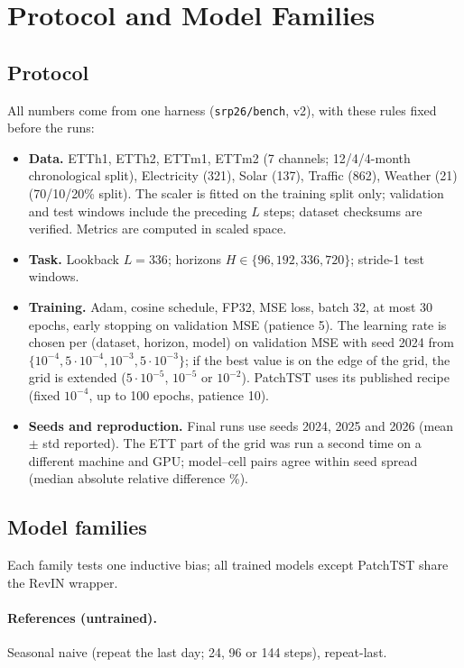 \documentclass[11pt,a4paper]{article}
\begin{document}
\section{Protocol and Model Families}
\label{sec:protocol}

\subsection{Protocol}
All numbers come from one harness (\texttt{srp26/bench}, v2), with these rules fixed before the runs:
\begin{itemize}
    \item \textbf{Data.} ETTh1, ETTh2, ETTm1, ETTm2 (7 channels; 12/4/4-month chronological split), Electricity (321), Solar (137), Traffic (862), Weather (21) (70/10/20\% split). The scaler is fitted on the training split only; validation and test windows include the preceding $L$ steps; dataset checksums are verified. Metrics are computed in scaled space.
    \item \textbf{Task.} Lookback $L{=}336$; horizons $H\in\{96,192,336,720\}$; stride-1 test windows.
    \item \textbf{Training.} Adam, cosine schedule, FP32, MSE loss, batch 32, at most 30 epochs, early stopping on validation MSE (patience 5). The learning rate is chosen per (dataset, horizon, model) on validation MSE with seed 2024 from $\{10^{-4},5\cdot10^{-4},10^{-3},5\cdot10^{-3}\}$; if the best value is on the edge of the grid, the grid is extended ($5\cdot10^{-5}$, $10^{-5}$ or $10^{-2}$). PatchTST uses its published recipe (fixed $10^{-4}$, up to 100 epochs, patience 10).
    \item \textbf{Seeds and reproduction.} Final runs use seeds 2024, 2025 and 2026 (mean $\pm$ std reported). The ETT part of the grid was run a second time on a different machine and GPU; \xmAgree{} model--cell pairs agree within seed spread (median absolute relative difference \xmMedAbs\%).
\end{itemize}

\subsection{Model families}
Each family tests one inductive bias; all trained models except PatchTST share the RevIN wrapper.

\paragraph{References (untrained).} Seasonal naive (repeat the last day; 24, 96 or 144 steps), repeat-last.
\end{document}
